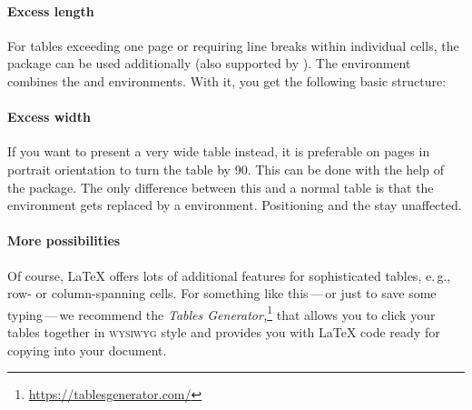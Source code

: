 \paragraph{Excess length}
For tables exceeding one page or requiring line breaks within individual cells,
the  package can be used additionally (also supported by ).
The  environment combines the  and  environments.
With it, you get the following basic structure:

\begin{samepage}
\end{samepage}

\paragraph{Excess width}
If you want to present a very wide table instead, it is preferable on pages in portrait orientation to turn the table by 90\textdegree{}.
This can be done with the help of the  package.
The only difference between this and a normal table is that the  environment gets replaced by a  environment.
Positioning and the  stay unaffected.

\paragraph{More possibilities}
Of course, \LaTeX{} offers lots of additional features for sophisticated tables, e.\,g., row- or column-spanning cells.
For something like this\,---\,or just to save some typing\,---\,we recommend the \emph{Tables Generator}\textit{,}\footnote{\url{https://tablesgenerator.com/}} that allows you to click your tables together in \textsc{wysiwyg} style and provides you with \LaTeX{} code ready for copying into your document.


